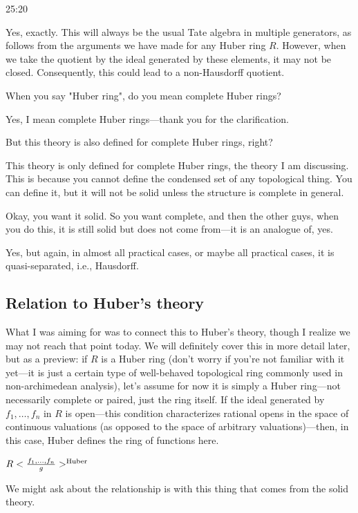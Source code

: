 \begin{unfinished}{25:20}
\begin{warning}
Yes, exactly. This will always be the usual Tate algebra in multiple generators, as follows from the arguments we have made for any Huber ring $R$. However, when we take the quotient by the ideal generated by these elements, it may not be closed. Consequently, this could lead to a non-Hausdorff quotient.
\end{warning}

\ques When you say "Huber ring", do you mean complete Huber rings?

\ans Yes, I mean complete Huber rings---thank you for the clarification. 

\ques But this theory is also defined for complete Huber rings, right? 

\ans This theory is only defined for complete Huber rings, the theory I am discussing. This is because you cannot define the condensed set of any topological thing. You can define it, but it will not be solid unless the structure is complete in general. 

\ques Okay, you want it solid. So you want complete, and then the other guys, when you do this, it is still solid but does not come from---it is an analogue of, yes.

\ans Yes, but again, in almost all practical cases, or maybe all practical cases, it is quasi-separated, i.e., Hausdorff.

\subsection{Relation to Huber's theory}

What I was aiming for was to connect this to Huber's theory, though I realize we may not reach that point today.
We will definitely cover this in more detail later, but as a preview: if $R$ is a Huber ring (don't worry if you're not familiar with it yet---it is just a certain type of well-behaved topological ring commonly used in non-archimedean analysis), let's assume for now it is simply a Huber ring---not necessarily complete or paired, just the ring itself.
If the ideal generated by $f_1, \ldots, f_n$ in $R$ is open---this condition characterizes rational opens in the space of continuous valuations (as opposed to the space of arbitrary valuations)---then, in this case, Huber defines the ring of functions here.


$R < \frac{f_1, \ldots, f_n}{g}> ^{\mathrm{Huber}} $

We might ask about the relationship is with this thing that comes from the solid theory.


\end{unfinished}
